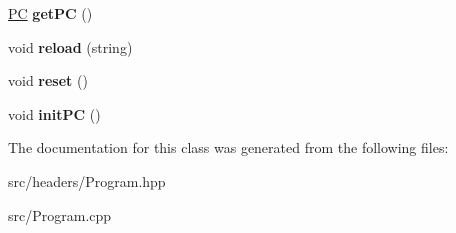 \begin{DoxyCompactItemize}
\item 
\hypertarget{classProgram_a7f77cefd84d0a9f31bc2909af70980bf}{\hyperlink{classPC}{P\-C} {\bfseries get\-P\-C} ()}\label{classProgram_a7f77cefd84d0a9f31bc2909af70980bf}

\item 
\hypertarget{classProgram_a2397451fffeeca19728ebbf2ea68f26b}{void {\bfseries reload} (string)}\label{classProgram_a2397451fffeeca19728ebbf2ea68f26b}

\item 
\hypertarget{classProgram_aeb6d22c6dc2202ea374fc6b9ce81a2f4}{void {\bfseries reset} ()}\label{classProgram_aeb6d22c6dc2202ea374fc6b9ce81a2f4}

\item 
\hypertarget{classProgram_a8cb065b057057bb900d290b1df63563f}{void {\bfseries init\-P\-C} ()}\label{classProgram_a8cb065b057057bb900d290b1df63563f}

\end{DoxyCompactItemize}


The documentation for this class was generated from the following files\-:\begin{DoxyCompactItemize}
\item 
src/headers/Program.\-hpp\item 
src/Program.\-cpp\end{DoxyCompactItemize}
